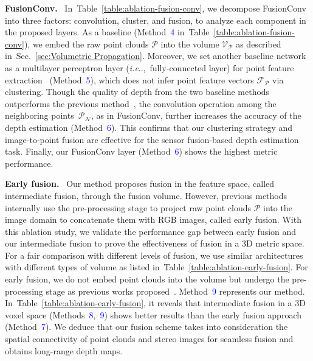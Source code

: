 \documentclass[letterpaper, 10 pt, conference]{ieeeconf}
\makeatletter
\DeclareRobustCommand\onedot{\futurelet\@let@token\@onedot}
\def\@onedot{\ifx\@let@token.\else.\null\fi\xspace}
\def\ie{\emph{i.e}\onedot} \def\Ie{{I.e}\onedot}
\newcommand{\Tref}[1]{Table~\textcolor{blue}{\ref{#1}}}
\newcommand{\Sref}[1]{Sec.~\textcolor{blue}{\ref{#1}}}
\makeatother
\begin{document}
\noindent \textbf{FusionConv.} \
In~\Tref{table:ablation-fusion-conv}, we decompose FusionConv into three factors: convolution, cluster, and fusion, to analyze each component in the proposed layers. As a baseline (Method~\textcolor{blue}{4} in~\Tref{table:ablation-fusion-conv}), we embed the raw point clouds $\mathcal{P}$ into the volume $\mathcal{V}_{\mathcal{P}}$ as described in~\Sref{sec:Volumetric Propagation}. Moreover, we set another baseline network as a multilayer perceptron layer (\ie,~fully-connected layer) for point feature extraction~\cite{pointnet} (Method~\textcolor{blue}{5}), which does not infer point feature vectors $\mathcal{F}_{\mathcal{P}}$ via clustering. Though the quality of depth from the two baseline methods outperforms the previous method~\cite{stereolidar_norm_costV_ccvn}, the convolution operation among the neighboring points~$\mathcal{P}_{\mathcal{N}}$, as in FusionConv, further increases the accuracy of the depth estimation (Method~\textcolor{blue}{6}). This confirms that our clustering strategy and image-to-point fusion are effective for the sensor fusion-based depth estimation task. Finally, our FusionConv layer (Method~\textcolor{blue}{6}) shows the highest metric performance. 


\noindent \textbf{Early fusion.} \
Our method proposes fusion in the feature space, called intermediate fusion, through the fusion volume. However, previous methods~\cite{stereolidar_01,stereolidar_00,stereolidar_norm_costV_ccvn} internally use the pre-processing stage to project raw point clouds $\mathcal{P}$ into the image domain to concatenate them with RGB images, called early fusion. With this ablation study, we validate the performance gap between early fusion and our intermediate fusion to prove the effectiveness of fusion in a 3D metric space. For a fair comparison with different levels of fusion, we use similar architectures with different types of volume as listed in~\Tref{table:ablation-early-fusion}. For early fusion, we do not embed point clouds into the volume but undergo the pre-processing stage as previous works proposed~\cite{stereolidar_01,stereolidar_00,stereolidar_norm_costV_ccvn}. Method~\textcolor{blue}{9} represents our method. In~\Tref{table:ablation-early-fusion}, it reveals that intermediate fusion in a 3D voxel space (Methods~\textcolor{blue}{8},~\textcolor{blue}{9}) shows better results than the early fusion approach (Method~\textcolor{blue}{7}). We deduce that our fusion scheme takes into consideration the spatial connectivity of point clouds and stereo images for seamless fusion and obtains long-range depth maps.
\end{document}
